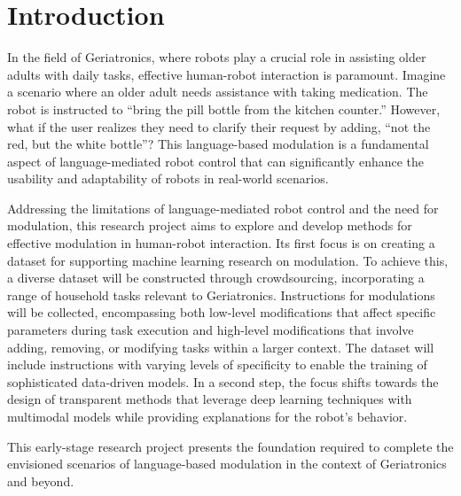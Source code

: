 \documentclass[journal]{IEEEtran}
\begin{document}
%



\section{Introduction}
In the field of Geriatronics, where robots play a crucial role in assisting 
older adults with daily tasks, effective human-robot interaction is paramount. 
Imagine a scenario where an older adult needs assistance with taking medication. 
The robot is instructed to ``bring the pill bottle from the kitchen counter.'' 
However, what if the user realizes they need to clarify their request by adding, 
``not the red, but the white bottle''? This language-based modulation is a fundamental 
aspect of language-mediated robot control that can significantly enhance the usability 
and adaptability of robots in real-world scenarios.

Addressing the limitations of language-mediated robot control and the need for 
modulation, this research project aims to explore and develop methods for effective 
modulation in human-robot interaction. Its first focus is on creating a dataset for supporting 
machine learning research on modulation. To achieve this, a diverse dataset will be constructed 
through crowdsourcing, incorporating a range of household tasks relevant to Geriatronics. 
Instructions for modulations will be collected, encompassing both low-level modifications 
that affect specific parameters during task execution and high-level modifications that 
involve adding, removing, or modifying tasks within a larger context. The dataset will 
include instructions with varying levels of specificity to enable the training of 
sophisticated data-driven models. In a second step, the focus shifts towards the design
of transparent methods that leverage deep learning techniques with multimodal models
while providing explanations for the robot's behavior. 

This early-stage research project presents the foundation 
required to complete the envisioned scenarios of language-based modulation
in the context of Geriatronics and beyond.
\end{document}
